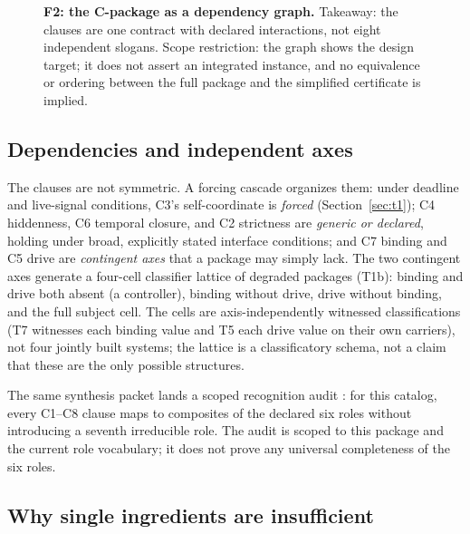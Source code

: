 \begin{figure}[t]
\centering
{}
\caption{\textbf{F2: the C-package as a dependency graph.} Takeaway: the
clauses are one contract with declared interactions, not eight independent
slogans. Scope restriction: the graph shows the design target; it does not
assert an integrated instance, and no equivalence or ordering between the full
package and the simplified certificate is implied.}
\label{fig:cpackage}
\end{figure}

\subsection{Dependencies and independent axes}

The clauses are not symmetric. A forcing cascade organizes them: under
deadline and live-signal conditions, C3's self-coordinate is \emph{forced}
(Section~\ref{sec:t1}); C4 hiddenness, C6 temporal closure, and C2 strictness
are \emph{generic or declared}, holding under broad, explicitly stated
interface conditions; and C7 binding and C5 drive are \emph{contingent axes}
that a package may simply lack. The two contingent axes generate a four-cell
classifier lattice of degraded packages (T1b): binding and drive both absent
(a controller), binding without drive, drive without binding, and the full
subject cell. The cells are axis-independently witnessed classifications
(T7 witnesses each binding value and T5 each drive value on their own
carriers), not four jointly built systems; the lattice is a classificatory
schema, not a claim that these are the only possible structures.

The same synthesis packet lands a scoped recognition audit \gradeR{}: for this
catalog, every C1--C8 clause maps to composites of the declared six roles
without introducing a seventh irreducible role. The audit is scoped to this
package and the current role vocabulary; it does not prove any universal
completeness of the six roles.

\subsection{Why single ingredients are insufficient}
\label{sec:insufficient}

